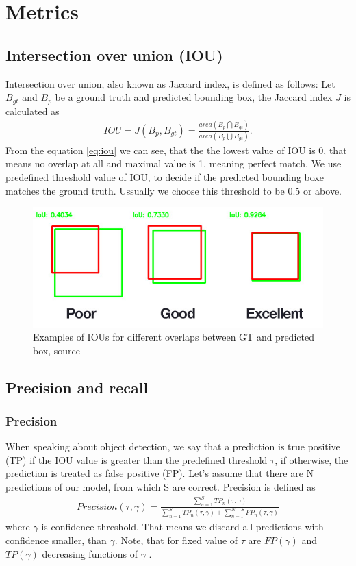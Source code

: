 \section{Metrics}
\subsection{Intersection over union (IOU) }
Intersection over union, also known as Jaccard index, is defined as follows: Let $B_{gt}$ and $B_p$ be a ground truth and predicted bounding box, the Jaccard index $J$ is calculated as
\begin{align}
    IOU = J(B_p, B_{gt}) = \frac{area(B_p \bigcap B_{gt})}{area(B_p \bigcup B_{gt})}.
    \label{eq:iou}
\end{align}
From the equation \ref{eq:iou} we can see, that the the lowest value of IOU is 0, that means no overlap at all and maximal value is 1, meaning perfect match.
We use predefined threshold value of IOU, to decide if the predicted bounding boxe matches the ground truth. Ussually we choose this threshold to be 0.5 or above.

\begin{figure}
    \includegraphics[width = \linewidth]{images/IOU.jpg}
    \caption{Examples of IOUs for different overlaps between GT and predicted box, source \cite{Cowton2019}}
    \label{fig:iou}
\end{figure}

\subsection{Precision and recall}
\subsubsection{Precision}
\label{subsec:precision}
When speaking about object detection, we say that a prediction is true positive (TP) if the IOU value is greater than the predefined threshold $\tau$, if otherwise, the prediction is treated as false positive (FP). Let's assume that there are N predictions of our model, from which S are correct. Precision is defined as
\begin{align}
    Precision(\tau, \gamma) = \frac{\sum_{n=1}^S TP_n(\tau, \gamma)}{\sum_{n=1}^S TP_n(\tau, \gamma) + \sum_{n=1}^{N-S} FP_n(\tau, \gamma)}
\end{align}
where $\gamma$ is confidence threshold. That means we discard all predictions with confidence smaller, than $\gamma$. Note, that for fixed value of $\tau$ are $FP(\gamma)$ and $TP(\gamma)$ decreasing functions of $\gamma$ \cite{Padilla2021}.

